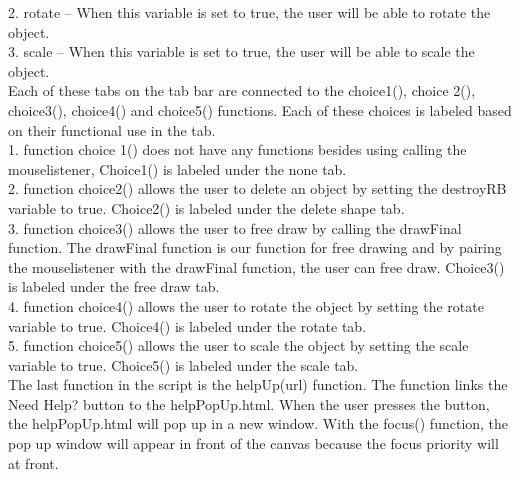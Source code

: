 \documentclass[a4paper, 11pt]{article} %
\begin{document}
2.	rotate – When this variable is set to true, the user will be able to rotate the object. \\

3.	scale – When this variable is set to true, the user will be able to scale the object. \\

Each of these tabs on the tab bar are connected to the choice1(), choice 2(), choice3(), choice4() and choice5() functions. Each of these choices is labeled based on their functional use in the tab. \\

1.	function choice 1() does not have any functions besides using calling the mouselistener, Choice1() is labeled under the none tab.\\

2.	function choice2() allows the user to delete an object by setting the destroyRB variable to true. Choice2() is labeled under the delete shape tab.\\

3.	function choice3() allows the user to free draw by calling the drawFinal function. The drawFinal function is our function for free drawing and by pairing the mouselistener with the drawFinal function, the user can free draw. Choice3() is labeled under the free draw tab.\\

4.	function choice4() allows the user to rotate the object by setting the rotate variable to true. Choice4() is labeled under the rotate tab.\\

5.	function choice5() allows the user to scale the object by setting the scale variable to true. Choice5() is labeled under the scale tab.\\

The last function in the script is the helpUp(url) function. The function links the Need Help? button to the helpPopUp.html. When the user presses the button, the helpPopUp.html will pop up in a new window. With the focus() function, the pop up window will appear in front of the canvas because the focus priority will at front.
\end{document}
